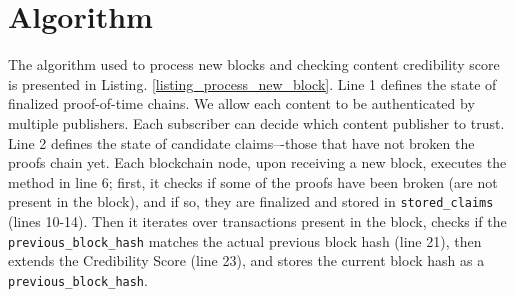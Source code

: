 \section{Algorithm}
The algorithm used to process new blocks and checking content credibility score is presented in Listing. \ref{listing_process_new_block}. Line 1 defines the state of finalized proof-of-time chains. We allow each content to be authenticated by multiple publishers. Each subscriber can decide which content publisher to trust. Line 2 defines the state of candidate claims–-those that have not broken the proofs chain yet. Each blockchain node, upon receiving a new block, executes the method in line 6; first, it checks if some of the proofs have been broken (are not present in the block), and if so, they are finalized and stored in \verb|stored_claims| (lines 10-14). Then it iterates over transactions present in the block, checks if the \verb|previous_block_hash| matches the actual previous block hash (line 21), then extends the Credibility Score (line 23), and stores the current block hash as a \verb|previous_block_hash|.






